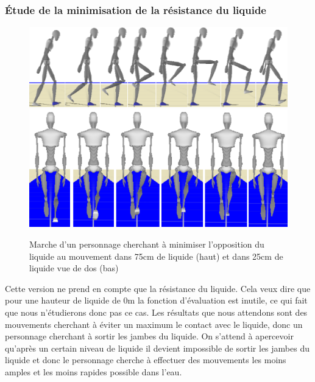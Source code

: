 \documentclass[runningheads,a4paper]{llncs}
\begin{document}
\subsubsection{Étude de la minimisation de la résistance du liquide}

\begin{figure}[h]
\centering
\includegraphics[scale=0.4]{strips/min_drag_75cm.png}
\includegraphics[scale=0.4]{strips/min_drag_25cm_from_back.png}
\caption{Marche d'un personnage cherchant à minimiser l'opposition du liquide au mouvement dans 75cm de liquide (haut) et dans 25cm de liquide vue de dos (bas)}
\label{fig:min_drag2}
\end{figure}

Cette version ne prend en compte que la résistance du liquide. Cela veux dire que pour une hauteur de liquide de 0m la fonction d'évaluation est inutile, ce qui fait que nous n'étudierons donc pas ce cas. Les résultats que nous attendons sont des mouvements cherchant à éviter un maximum le contact avec le liquide, donc un personnage cherchant à sortir les jambes du liquide. On s'attend à apercevoir qu'après un certain niveau de liquide il devient impossible de sortir les jambes du liquide et donc le personnage cherche à effectuer des mouvements les moins amples et les moins rapides possible dans l'eau. 
 
\end{document}
